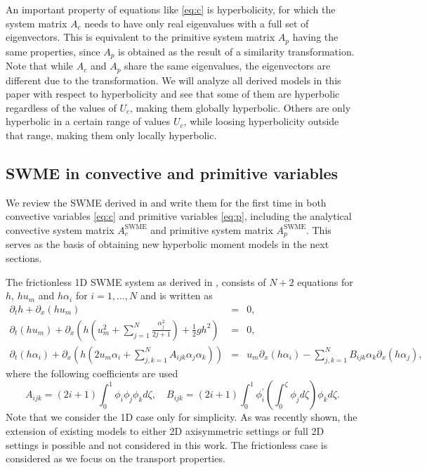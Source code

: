 \documentclass[a4paper, 11pt]{article}
\begin{document}
An important property of equations like \eqref{eq:c} is hyperbolicity, for which the system matrix $A_{c}$ needs to have only real eigenvalues with a full set of eigenvectors. This is equivalent to the primitive system matrix $A_{p}$ having the same properties, since $A_{p}$ is obtained as the result of a similarity transformation. Note that while $A_{c}$ and $A_{p}$ share the same eigenvalues, the eigenvectors are different due to the transformation.
We will analyze all derived models in this paper with respect to hyperbolicity and see that some of them are hyperbolic regardless of the values of $U_{c}$, making them globally hyperbolic. Others are only hyperbolic in a certain range of values $U_{c}$, while loosing hyperbolicity outside that range, making them only locally hyperbolic.


\subsection{SWME in convective and primitive variables}
\label{sec:SWME_c_p}
We review the SWME derived in \cite{Kowalski2019} and write them for the first time in both convective variables \eqref{eq:c} and primitive variables \eqref{eq:p}, including the analytical convective system matrix $A_{c}^{\textrm{SWME}}$ and primitive system matrix $A_{p}^{\textrm{SWME}}$.
This serves as the basis of obtaining new hyperbolic moment models in the next sections.

The frictionless 1D SWME system as derived in \cite{Kowalski2019}, consists of $N+2$ equations for $h$, $hu_m$ and $h \alpha_i$ for $i=1, \ldots, N$ and is written as
\begin{eqnarray}
    \partial_t h+\partial_x\left(h u_m\right) &=& 0, \label{eq:SWME_h}\\
    \partial_t\!\left(h u_m\right)+\partial_x\!\left(\!h\!\left(\!u_m^2+\sum_{j=1}^N \frac{\alpha_j^2}{2 j+1}\!\right)\!+\!\frac{1}{2} g h^2\!\right)\! &=& 0, \label{eq:SWME_um}\\
    \partial_t\!\left(h \alpha_i\right)+\partial_x\!\left(\!h\!\left(\!2 u_m \alpha_i+\sum_{j, k=1}^N A_{i j k} \alpha_j \alpha_k\!\right)\!\right)\! &=&  u_m \partial_x\!\left(h \alpha_i\right)\! -\! \sum_{j, k=1}^N \!B_{i j k} \alpha_k \partial_x\left(h \alpha_j\right)\!, \label{eq:SWME_alphai}
\end{eqnarray}
where the following coefficients are used
\begin{equation}\label{eq:Aijk_Bijk}
    A_{i j k}=(2 i+1) \int_0^1 \phi_i \phi_j \phi_k d \zeta, \quad B_{i j k}=(2 i+1) \int_0^1 \phi_i^{\prime}\left(\int_0^\zeta \phi_j d \zeta\right) \phi_k d \zeta.
\end{equation}
Note that we consider the 1D case only for simplicity. As was recently shown, the extension of existing models to either 2D axisymmetric settings \cite{Verbiest2025} or full 2D settings \cite{Bauerle2025} is possible and not considered in this work. The frictionless case is considered as we focus on the transport properties.
\end{document}
